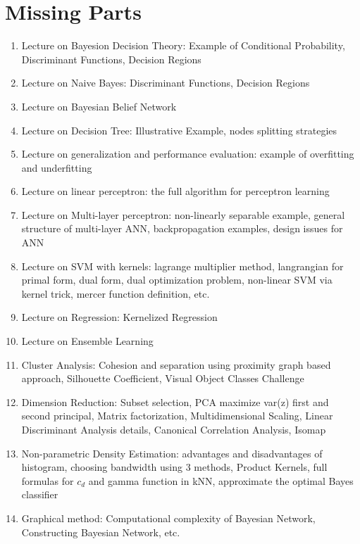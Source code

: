 \chapter{Missing Parts}

\begin{enumerate}
    \item Lecture on Bayesion Decision Theory: Example of Conditional Probability, Discriminant Functions, Decision Regions
    \item Lecture on Naive Bayes: Discriminant Functions, Decision Regions
    \item Lecture on Bayesian Belief Network
    \item Lecture on Decision Tree: Illustrative Example, nodes splitting strategies
    \item Lecture on generalization and performance evaluation: example of overfitting and underfitting 
    \item Lecture on linear perceptron: the full algorithm for perceptron learning
    \item Lecture on Multi-layer perceptron: non-linearly separable example, general structure of multi-layer ANN, backpropagation examples, design issues for ANN
    \item Lecture on SVM with kernels: lagrange multiplier method, langrangian for primal form, dual form, dual optimization problem, non-linear SVM via kernel trick, mercer function definition, etc.
    \item Lecture on Regression: Kernelized Regression
    \item Lecture on Ensemble Learning
    \item Cluster Analysis: Cohesion and separation using proximity graph based approach, Silhouette Coefficient, Visual Object Classes Challenge
    \item Dimension Reduction: Subset selection, PCA maximize var(z) first and second principal, Matrix factorization, Multidimensional Scaling, Linear Discriminant Analysis details, Canonical Correlation Analysis, Isomap
    \item Non-parametric Density Estimation: advantages and disadvantages of histogram, choosing bandwidth using 3 methods, Product Kernels, full formulas for $c_d$ and gamma function in kNN, approximate the optimal Bayes classifier
    \item Graphical method: Computational complexity of Bayesian Network, Constructing Bayesian Network, etc. 
\end{enumerate}